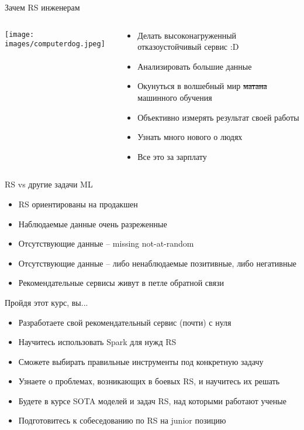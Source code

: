 \documentclass[11pt,aspectratio=169]{beamer}
\begin{document}
\begin{frame}{Зачем RS инженерам}

\begin{columns}
\begin{column}{0.4\textwidth}
   \begin{center}
                \texttt{[image: images/computerdog.jpeg]}
   \end{center}
\end{column}
\begin{column}{0.5\textwidth}
    \begin{small}
    \begin{itemize}
    \item Делать высоконагруженный отказоустойчивый сервис :D
    \item Анализировать большие данные
    \item Окунуться в волшебный мир \sout{матана} машинного обучения
    \item Объективно измерять результат своей работы 
    \item Узнать много нового о людях
    \item Все это за зарплату
    \end{itemize}
    \end{small}
\end{column}
\end{columns}

\end{frame}

\begin{frame}{RS vs другие задачи ML \cite{NETFLIX}}

\begin{itemize}[<+->]
\item RS ориентированы на продакшен
\item Наблюдаемые данные очень разреженные
\item Отсутствующие данные -- missing not-at-random
\item Отсутствующие данные -- либо ненаблюдаемые позитивные, либо негативные
\item Рекомендательные сервисы живут в петле обратной связи
\end{itemize}

\end{frame}

\begin{frame}{Пройдя этот курс, вы...}

\begin{itemize}
\item Разработаете свой рекомендательный сервис (почти) с нуля
\item Научитесь использовать Spark для нужд RS
\item Сможете выбирать правильные инструменты под конкретную задачу
\item Узнаете о проблемах, возникающих в боевых RS, и научитесь их решать
\item Будете в курсе SOTA моделей и задач RS, над которыми работают ученые
\item Подготовитесь к собеседованию по RS на junior позицию
\end{itemize}

\end{frame}
\end{document}
